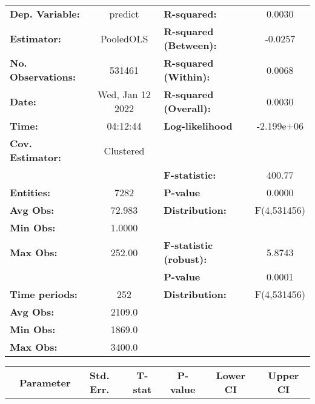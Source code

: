 \begin{center}
\begin{tabular}{lclc}
\toprule
\textbf{Dep. Variable:}    &      predict       & \textbf{  R-squared:         }   &      0.0030      \\
\textbf{Estimator:}        &     PooledOLS      & \textbf{  R-squared (Between):}  &     -0.0257      \\
\textbf{No. Observations:} &       531461       & \textbf{  R-squared (Within):}   &      0.0068      \\
\textbf{Date:}             &  Wed, Jan 12 2022  & \textbf{  R-squared (Overall):}  &      0.0030      \\
\textbf{Time:}             &      04:12:44      & \textbf{  Log-likelihood     }   &    -2.199e+06    \\
\textbf{Cov. Estimator:}   &     Clustered      & \textbf{                     }   &                  \\
\textbf{}                  &                    & \textbf{  F-statistic:       }   &      400.77      \\
\textbf{Entities:}         &        7282        & \textbf{  P-value            }   &      0.0000      \\
\textbf{Avg Obs:}          &       72.983       & \textbf{  Distribution:      }   &   F(4,531456)    \\
\textbf{Min Obs:}          &       1.0000       & \textbf{                     }   &                  \\
\textbf{Max Obs:}          &       252.00       & \textbf{  F-statistic (robust):} &      5.8743      \\
\textbf{}                  &                    & \textbf{  P-value            }   &      0.0001      \\
\textbf{Time periods:}     &        252         & \textbf{  Distribution:      }   &   F(4,531456)    \\
\textbf{Avg Obs:}          &       2109.0       & \textbf{                     }   &                  \\
\textbf{Min Obs:}          &       1869.0       & \textbf{                     }   &                  \\
\textbf{Max Obs:}          &       3400.0       & \textbf{                     }   &                  \\
\bottomrule
\end{tabular}
\begin{tabular}{lcccccc}
                & \textbf{Parameter} & \textbf{Std. Err.} & \textbf{T-stat} & \textbf{P-value} & \textbf{Lower CI} & \textbf{Upper CI}  \\

\end{tabular}
\end{center}
